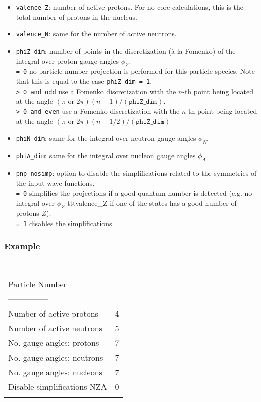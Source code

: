 \documentclass[a4paper,11pt]{article}
\newcommand{\ttt}[1]{\texttt{#1}}
\begin{document}
\begin{itemize}
 \item \ttt{valence\_Z}: number of active protons. For no-core calculations, this is the total number
  of protons in the nucleus. 
 \item \ttt{valence\_N}: same for the number of active neutrons. 
 \item \ttt{phiZ\_dim}: number of points in the discretization (à la Fomenko) of the integral over proton gauge angles $\phi_Z$. \\[0.05cm]
  \ttt{= 0\:} no particle-number projection is performed for this particle species. Note that this is equal to the case \ttt{phiZ\_dim = 1}. \\[0.05cm]
  \ttt{> 0 and odd\:} use a Fomenko discretization with the $n$-th point being located at the angle $(\pi \text{ or } 2\pi) (n-1)/(\ttt{phiZ\_dim})$. \\[0.05cm]
  \ttt{> 0 and even\:} use a Fomenko discretization with the $n$-th point being located at the angle $(\pi \text{ or } 2\pi) (n-1/2)/(\ttt{phiZ\_dim})$ 
 \item \ttt{phiN\_dim}: same for the integral over neutron gauge angles $\phi_N$. 
 \item \ttt{phiA\_dim}: same for the integral over nucleon gauge angles $\phi_A$. 
 \item \ttt{pnp\_nosimp}: option to disable the simplifications related to the symmetries of the input wave functions. \\[0.05cm]
  \ttt{= 0\:} simplifies the projections if a good quantum number is detected (e.g. no integral over $\phi_Z$ ttt{valence\_Z} if one of the states has a good number of protons $Z$). \\[0.05cm]
  \ttt{= 1\:} disables the simplifications.

\end{itemize}

\subsubsection*{Example}
\begin{center}
\tt
\begin{tabular}{|ll|}
\hline
Particle Number               &      \\
---------------               &      \\
Number of active protons      &4     \\
Number of active neutrons     &5     \\
No. gauge angles: protons     &7     \\
No. gauge angles: neutrons    &7     \\
No. gauge angles: nucleons    &7     \\
Disable simplifications NZA   &0     \\
                              &      \\
\hline
\end{tabular}
\end{center}
\end{document}
